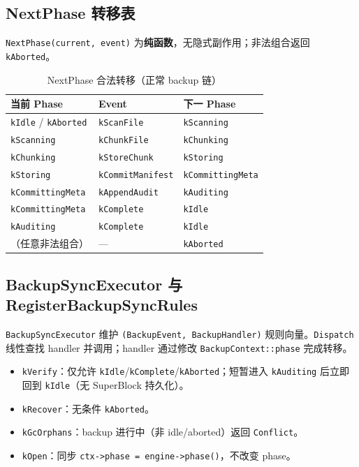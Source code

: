 \subsection{NextPhase 转移表}

\texttt{NextPhase(current, event)} 为\textbf{纯函数}，无隐式副作用；非法组合返回 \texttt{kAborted}。

\begin{table}[htbp]
\centering
\caption{NextPhase 合法转移（正常 backup 链）}
\label{tab:next-phase}
\small
\begin{tabular}{@{}lll@{}}
\toprule
当前 Phase & Event & 下一 Phase \\
\midrule
\texttt{kIdle} / \texttt{kAborted} & \texttt{kScanFile} & \texttt{kScanning} \\
\texttt{kScanning} & \texttt{kChunkFile} & \texttt{kChunking} \\
\texttt{kChunking} & \texttt{kStoreChunk} & \texttt{kStoring} \\
\texttt{kStoring} & \texttt{kCommitManifest} & \texttt{kCommittingMeta} \\
\texttt{kCommittingMeta} & \texttt{kAppendAudit} & \texttt{kAuditing} \\
\texttt{kCommittingMeta} & \texttt{kComplete} & \texttt{kIdle} \\
\texttt{kAuditing} & \texttt{kComplete} & \texttt{kIdle} \\
（任意非法组合） & --- & \texttt{kAborted} \\
\bottomrule
\end{tabular}
\end{table}

\subsection{BackupSyncExecutor 与 RegisterBackupSyncRules}

\texttt{BackupSyncExecutor} 维护 \texttt{(BackupEvent, BackupHandler)} 规则向量。\texttt{Dispatch} 线性查找 handler 并调用；handler 通过修改 \texttt{BackupContext::phase} 完成转移。

\begin{designbox}[特殊 Event 语义]
\begin{itemize}[nosep]
  \item \texttt{kVerify}：仅允许 \texttt{kIdle}/\texttt{kComplete}/\texttt{kAborted}；短暂进入 \texttt{kAuditing} 后立即回到 \texttt{kIdle}（无 SuperBlock 持久化）。
  \item \texttt{kRecover}：无条件 \texttt{kAborted}。
  \item \texttt{kGcOrphans}：backup 进行中（非 idle/aborted）返回 \texttt{Conflict}。
  \item \texttt{kOpen}：同步 \texttt{ctx->phase = engine->phase()}，不改变 phase。
\end{itemize}
\end{designbox}

